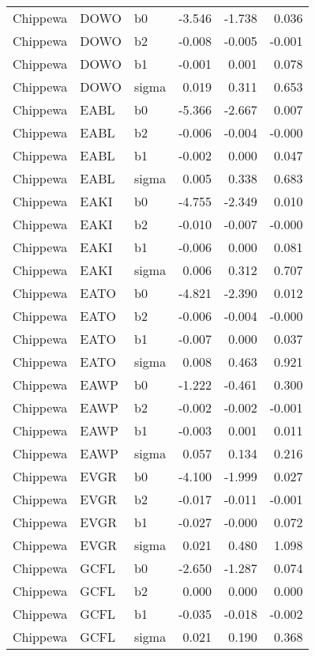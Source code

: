 \begin{table}[ht]
\begin{center}
\begin{tabular}{lllrrr}
  Chippewa & DOWO & b0 & -3.546 & -1.738 & 0.036 \\ 
  Chippewa & DOWO & b2 & -0.008 & -0.005 & -0.001 \\ 
  Chippewa & DOWO & b1 & -0.001 & 0.001 & 0.078 \\ 
  Chippewa & DOWO & sigma & 0.019 & 0.311 & 0.653 \\ 
  Chippewa & EABL & b0 & -5.366 & -2.667 & 0.007 \\ 
  Chippewa & EABL & b2 & -0.006 & -0.004 & -0.000 \\ 
  Chippewa & EABL & b1 & -0.002 & 0.000 & 0.047 \\ 
  Chippewa & EABL & sigma & 0.005 & 0.338 & 0.683 \\ 
  Chippewa & EAKI & b0 & -4.755 & -2.349 & 0.010 \\ 
  Chippewa & EAKI & b2 & -0.010 & -0.007 & -0.000 \\ 
  Chippewa & EAKI & b1 & -0.006 & 0.000 & 0.081 \\ 
  Chippewa & EAKI & sigma & 0.006 & 0.312 & 0.707 \\ 
  Chippewa & EATO & b0 & -4.821 & -2.390 & 0.012 \\ 
  Chippewa & EATO & b2 & -0.006 & -0.004 & -0.000 \\ 
  Chippewa & EATO & b1 & -0.007 & 0.000 & 0.037 \\ 
  Chippewa & EATO & sigma & 0.008 & 0.463 & 0.921 \\ 
  Chippewa & EAWP & b0 & -1.222 & -0.461 & 0.300 \\ 
  Chippewa & EAWP & b2 & -0.002 & -0.002 & -0.001 \\ 
  Chippewa & EAWP & b1 & -0.003 & 0.001 & 0.011 \\ 
  Chippewa & EAWP & sigma & 0.057 & 0.134 & 0.216 \\ 
  Chippewa & EVGR & b0 & -4.100 & -1.999 & 0.027 \\ 
  Chippewa & EVGR & b2 & -0.017 & -0.011 & -0.001 \\ 
  Chippewa & EVGR & b1 & -0.027 & -0.000 & 0.072 \\ 
  Chippewa & EVGR & sigma & 0.021 & 0.480 & 1.098 \\ 
  Chippewa & GCFL & b0 & -2.650 & -1.287 & 0.074 \\ 
  Chippewa & GCFL & b2 & 0.000 & 0.000 & 0.000 \\ 
  Chippewa & GCFL & b1 & -0.035 & -0.018 & -0.002 \\ 
  Chippewa & GCFL & sigma & 0.021 & 0.190 & 0.368 \\ 

\end{tabular}
\end{center}
\end{table}
